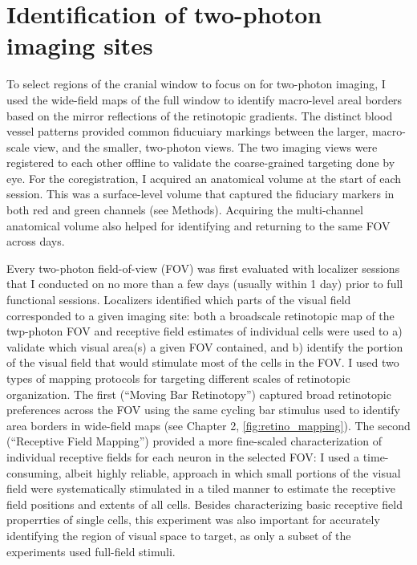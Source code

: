 \section{Identification of two-photon imaging sites}
To select regions of the cranial window to focus on for two-photon imaging, I used the wide-field maps of the full window to identify macro-level areal borders based on the mirror reflections of the retinotopic gradients. The distinct blood vessel patterns provided common fiducuiary markings between the larger, macro-scale view, and the smaller, two-photon views. The two imaging views were registered to each other offline to validate the coarse-grained targeting done by eye. For the coregistration, I acquired an anatomical volume at the start of each session. This was a surface-level volume that captured the fiduciary markers in both red and green channels (see Methods). Acquiring the multi-channel anatomical volume also helped for identifying and returning to the same FOV across days. 

Every two-photon field-of-view (FOV) was first evaluated with localizer sessions that I conducted on no more than a few days (usually within 1 day) prior to full functional sessions. Localizers identified which parts of the visual field corresponded to a given imaging site: both a broadscale retinotopic map of the twp-photon FOV and receptive field estimates of individual cells were used to a) validate which visual area(s) a given FOV contained, and b) identify the portion of the visual field that would stimulate most of the cells in the FOV. I used two types of mapping protocols for targeting different scales of retinotopic organization. The first (``Moving Bar Retinotopy'') captured broad retinotopic preferences across the FOV using the same cycling bar stimulus used to identify area borders in wide-field maps (see Chapter 2, \ref{fig:retino_mapping}). The second (``Receptive Field Mapping'') provided a more fine-scaled characterization of individual receptive fields for each neuron in the selected FOV:  I used a time-consuming, albeit highly reliable, approach in which small portions of the visual field were systematically stimulated in a tiled manner to estimate the receptive field positions and extents of all cells. Besides characterizing basic receptive field properrties of single cells, this experiment was also important for accurately identifying the region of visual space to target, as only a subset of the experiments used full-field stimuli. 

